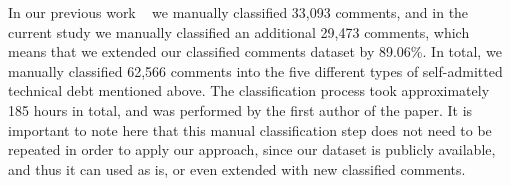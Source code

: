 In our previous work ~\cite{Maldonado2015MTD} we manually classified 33,093 comments, and in the current study we manually classified an additional 29,473 comments, which means that we extended our classified comments dataset by 89.06\%. In total, we manually classified 62,566 comments into the five different types of self-admitted technical debt mentioned above. The classification process took approximately 185 hours in total, and was performed by the first author of the paper. It is important to note here that this manual classification step does not need to be repeated in order to apply our approach, since our dataset is publicly available, and thus it can used as is, or even extended with new classified comments. 


